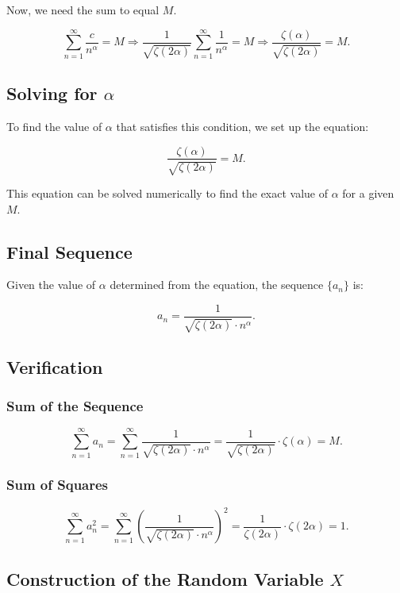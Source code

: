 \documentclass[a4 paper]{article}
\theoremstyle{boldStyle}
\theoremstyle{boldBlueStyle}
\theoremstyle{boldPurpleStyle}
\theoremstyle{boldRedStyle}
\begin{document}
\begin{enumerate}
Now, we need the sum to equal \(M\).

\[
\sum_{n=1}^{\infty} \frac{c}{n^\alpha} = M \Rightarrow \frac{1}{\sqrt{\zeta(2\alpha)}} \sum_{n=1}^{\infty} \frac{1}{n^\alpha} = M \Rightarrow \frac{\zeta(\alpha)}{\sqrt{\zeta(2\alpha)}} = M.
\]

\subsection*{Solving for \(\alpha\)}

To find the value of \(\alpha\) that satisfies this condition, we set up the equation:

\[
\frac{\zeta(\alpha)}{\sqrt{\zeta(2\alpha)}} = M.
\]

This equation can be solved numerically to find the exact value of \(\alpha\) for a given \(M\).

\subsection*{Final Sequence}

Given the value of \(\alpha\) determined from the equation, the sequence \(\{a_n\}\) is:

\[
a_n = \frac{1}{\sqrt{\zeta(2\alpha)} \cdot n^\alpha}.
\]

\subsection*{Verification}

\subsubsection*{Sum of the Sequence}

\[
\sum_{n=1}^{\infty} a_n = \sum_{n=1}^{\infty} \frac{1}{\sqrt{\zeta(2\alpha)} \cdot n^\alpha} = \frac{1}{\sqrt{\zeta(2\alpha)}} \cdot \zeta(\alpha) = M.
\]

\subsubsection*{Sum of Squares}

\[
\sum_{n=1}^{\infty} a_n^2 = \sum_{n=1}^{\infty} \left(\frac{1}{\sqrt{\zeta(2\alpha)} \cdot n^\alpha}\right)^2 = \frac{1}{\zeta(2\alpha)} \cdot \zeta(2\alpha) = 1.
\]

\subsection*{Construction of the Random Variable \(X\)}


\end{enumerate}
\end{document}

